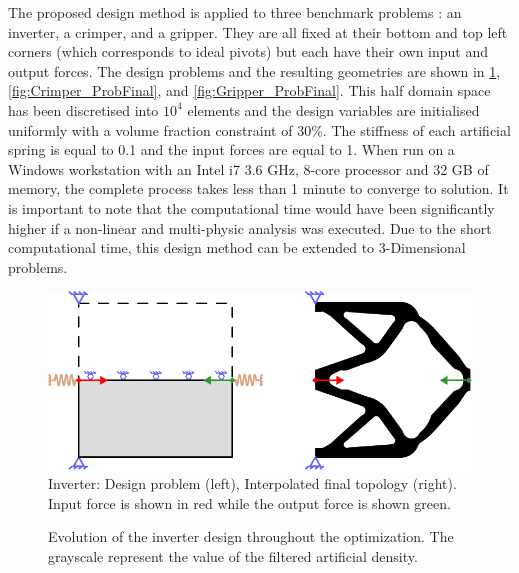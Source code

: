 The proposed design method is applied to three benchmark problems : an inverter, a crimper, and a gripper. They are all fixed at their bottom and top left corners (which corresponds to ideal pivots) but each have their own input and output forces. The design problems and the resulting geometries are shown in \cref{fig:Invert_ProbFinal}, \cref{fig:Crimper_ProbFinal}, and \cref{fig:Gripper_ProbFinal}. This half domain space has been discretised into $10^4$ elements and the design variables are initialised uniformly with a volume fraction constraint of 30\%. The stiffness of each artificial spring is equal to 0.1 and the input forces are equal to 1. When run on a Windows workstation with an Intel i7 3.6 GHz, 8-core processor and 32 GB of memory, the complete process takes less than 1 minute to converge to solution. It is important to note that the computational time would have been significantly higher if a non-linear and multi-physic analysis was executed. Due to the short computational time, this design method can be extended to 3-Dimensional problems.

\begin{figure}[hbt!]
    \centering
    \includegraphics[width=0.65\columnwidth]{images/chap5/Inverter_Schematic_FinalCAD.pdf}
    \caption{Inverter: Design problem (left), Interpolated final topology (right). Input force is shown in red while the output force is shown green.}
    \label{fig:Invert_ProbFinal}
\end{figure}

\begin{figure}[hbt!]
    \centering
    
    \caption{Evolution of the inverter design throughout the optimization. The grayscale represent the value of the filtered artificial density.}
    \label{fig:ForceInverter_evol}
\end{figure}

